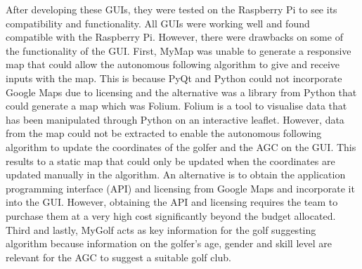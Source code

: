 \documentclass[11pt,landscape]{article}
\begin{document}
\begin{multicols}{3}
\begin{table}[H]
    \begin{center}
    \end{center}
    \label{tab:gui_descs}
\end{table}

After developing these GUIs, they were tested on the Raspberry Pi to see its
compatibility and functionality. All GUIs were working well and found compatible
with the Raspberry Pi. However, there were drawbacks on some of the
functionality of the GUI. First, MyMap was unable to generate a responsive map
that could allow the autonomous following algorithm to give and receive inputs
with the map. This is because PyQt and Python could not incorporate Google Maps
due to licensing and the alternative was a library from Python that could
generate a map which was Folium. Folium is a tool to visualise data that has
been manipulated through Python on an interactive leaflet. However, data from
the map could not be extracted to enable the autonomous following algorithm to
update the coordinates of the golfer and the AGC on the GUI. This results to a
static map that could only be updated when the coordinates are updated manually
in the algorithm. An alternative is to obtain the application programming
interface (API) and licensing from Google Maps and incorporate it into the GUI.
However, obtaining the API and licensing requires the team to purchase them at
a very high cost significantly beyond the budget allocated. Third and lastly,
MyGolf acts as key information for the golf suggesting algorithm because
information on the golfer’s age, gender and skill level are relevant for the
AGC to suggest a suitable golf club. 


\end{multicols}
\end{document}
